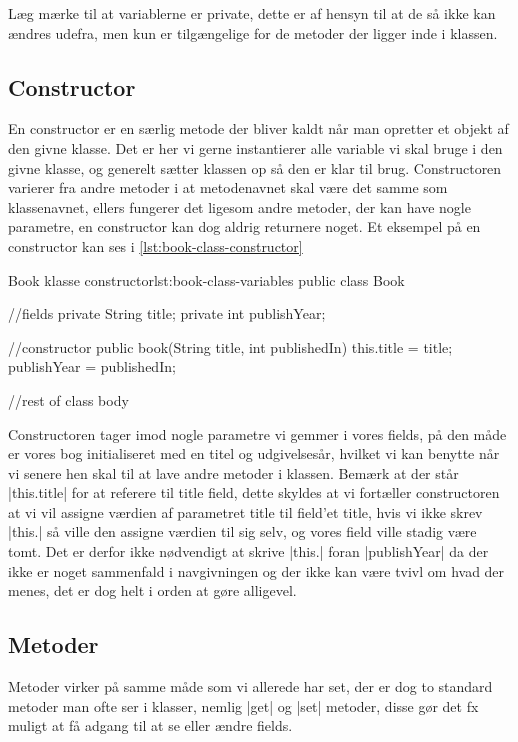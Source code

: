 Læg mærke til at variablerne er private, dette er af hensyn til at de så ikke kan ændres udefra, men kun er tilgængelige for de metoder der ligger inde i klassen.

\subsection{Constructor}

En constructor er en særlig metode der bliver kaldt når man opretter et objekt af den givne klasse. Det er her vi gerne instantierer alle variable vi skal bruge i den givne klasse, og generelt sætter klassen op så den er klar til brug. Constructoren varierer fra andre metoder i at metodenavnet skal være det samme som klassenavnet, ellers fungerer det ligesom andre metoder, der kan have nogle parametre, en constructor kan dog aldrig returnere noget. Et eksempel på en constructor kan ses i \autoref{lst:book-class-constructor}

\begin{JavaCode}{Book klasse constructor}{lst:book-class-variables}
	public class Book {
		//fields
		private String title;
		private int publishYear;
		
		//constructor
		public book(String title, int publishedIn) {
			this.title = title;
			publishYear = publishedIn;
		}
		
		//rest of class body
	}
\end{JavaCode}

Constructoren tager imod nogle parametre vi gemmer i vores fields, på den måde er vores bog initialiseret med en titel og udgivelsesår, hvilket vi kan benytte når vi senere hen skal til at lave andre metoder i klassen. Bemærk at der står \JavaInline|this.title| for at referere til title field, dette skyldes at vi fortæller constructoren at vi vil assigne værdien af parametret title til field'et title, hvis vi ikke skrev \JavaInline|this.| så ville den assigne værdien til sig selv, og vores field ville stadig være tomt. Det er derfor ikke nødvendigt at skrive \JavaInline|this.| foran \JavaInline|publishYear| da der ikke er noget sammenfald i navgivningen og der ikke kan være tvivl om hvad der menes, det er dog helt i orden at gøre alligevel.

\subsection{Metoder}

Metoder virker på samme måde som vi allerede har set, der er dog to standard metoder man ofte ser i klasser, nemlig \JavaInline|get| og \JavaInline|set| metoder, disse gør det fx muligt at få adgang til at se eller ændre fields. 

